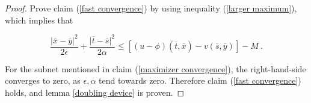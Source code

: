 \begin{lemma}
\begin{proof}
	 		Prove claim (\ref{fast convergence}) by using inequality (\ref{larger maximum}), which implies that
	 		
	 		\begin{equation*}
	 			 \frac{\lvert \overline{x} - \overline{y} \rvert^2}{2 \epsilon} + \frac{\lvert \overline{t} - \overline{s} \rvert^2}{2 \alpha} \leq \left[(u - \phi)(\overline{t}, \overline{x}) - v(\overline{s}, \overline{y}) \right] - M \ .
	 		\end{equation*}
	 		
	 		For the subnet mentioned in claim (\ref{maximizer convergence}), the right-hand-side converges to zero, as $ \epsilon, \alpha $ tend towards zero. Therefore claim (\ref{fast convergence}) holds, and lemma \ref{doubling device} is proven.
	\end{proof}
\end{lemma}